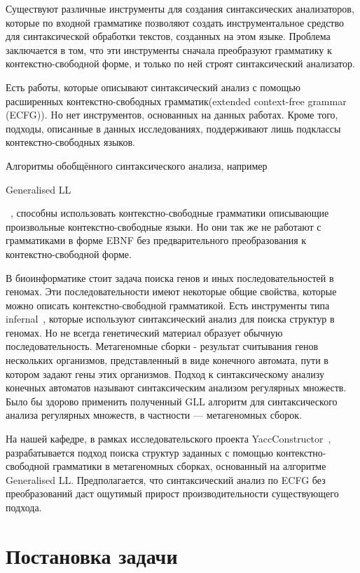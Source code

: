\documentclass[14pt]{matmex-diploma-custom}
\begin{document}
	Существуют различные инструменты для создания синтаксических анализаторов, которые 
	по входной грамматике позволяют создать инструментальное средство для синтаксической 
	обработки текстов, созданных на этом языке. Проблема заключается в том, что эти инструменты
	сначала преобразуют грамматику к контекстно-свободной форме, и только по ней 
	строят синтаксический анализатор.
	
	Есть работы, которые описывают синтаксический анализ с помощью расширенных
	контекстно-свободных грамматик(extended context-free grammar (ECFG)).
	Hо нет инструментов, основанных на данных работах. Кроме того, подходы, описанные
	в данных исследованиях, поддерживают лишь подклассы контекстно-свободных языков.
	
	Алгоритмы обобщённого синтаксического анализа, например
    \begin{english} Generalised LL \end{english}~\cite{scott2010gll}, 
	способны использовать контекстно-свободные грамматики описывающие произвольные 
	контекстно-свободные языки. Но они так же не работают с грамматиками в форме EBNF 
	без предварительного преобразования к контекстно-свободной форме.
	
	В биоинформатике стоит задача поиска генов и иных последовательностей в геномах. 
	Эти последовательности имеют некоторые общие свойства, которые можно описать 
	контекстно-свободной грамматикой. Есть инструменты типа infernal~\cite{Infernal}, которые 
	используют синтаксический анализ для поиска структур в геномах. Но не всегда 
	генетический материал образует обычную последовательность. Метагеномные сборки - 
	результат считывания генов нескольких организмов, представленный в виде конечного автомата, пути 
	в котором задают гены этих организмов. Подход к синтаксическому анализу конечных автоматов называют 
    синтаксическим анализом регулярных множеств. Было бы здорово применить полученный GLL алгоритм для
	синтаксического анализа регулярных множеств, в частности --- метагеномных сборок.
	
	На нашей кафедре, в рамках исследовательского проекта \newline YaccConstructor~\cite{YaccConstructor},
	разрабатывается подход поиска структур заданных с помощью контекстно-свободной
	грамматики в метагеномных сборках, основанный на алгоритме Generalised LL.
	Предполагается, что синтаксический анализ по ECFG без преобразований даст ощутимый
	прирост производительности существующего подхода.
	
	\section{Постановка задачи}
	
\end{document}
